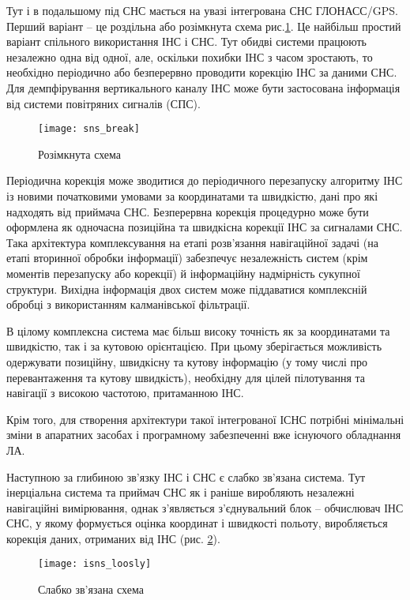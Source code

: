 Тут і в подальшому під СНС мається на увазі інтегрована СНС ГЛОНАСС/GPS. 
Перший варіант -- це роздільна або розімкнута схема рис.\ref{fig:isns_break}.  Це  найбільш 
простий варіант спільного використання ІНС і СНС. Тут обидві системи працюють незалежно 
одна від одної, але, оскільки похибки ІНС з часом зростають, то необхідно періодично
або безперервно проводити корекцію ІНС за даними СНС. Для демпфірування вертикального 
каналу ІНС може бути застосована інформація від системи повітряних сигналів (СПС).
\begin{figure}[here]
\centering
\texttt{[image: sns\_break]}
\caption{Розімкнута схема}
\label{fig:isns_break}
\end{figure}

Періодична корекція може зводитися до періодичного перезапуску алгоритму ІНС із новими 
початковими умовами за координатами та швидкістю, дані про які надходять від приймача СНС. 
Безперервна корекція процедурно може бути оформлена як одночасна позиційна та 
швидкісна корекції ІНС за сигналами СНС. Така архітектура комплексування на  
етапі розв'язання навігаційної задачі (на етапі вторинної обробки інформації) 
забезпечує незалежність систем (крім моментів  перезапуску або корекції) й 
інформаційну надмірність сукупної структури. Вихідна інформація двох систем може 
піддаватися комплексній обробці з використанням калманівської фільтрації.

В цілому комплексна система має більш високу точність як за координатами та швидкістю, 
так і за кутовою орієнтацією. При цьому зберігається можливість одержувати позиційну, 
швидкісну та кутову інформацію (у тому числі про перевантаження та кутову швидкість), 
необхідну для цілей пілотування та навігації з високою частотою, притаманною ІНС.

Крім того, для створення  архітектури такої інтегрованої ІСНС потрібні мінімальні зміни 
в апаратних засобах і програмному забезпеченні вже існуючого обладнання ЛА.

Наступною за глибиною зв'язку ІНС і СНС є слабко зв'язана система. Тут інерціальна 
система та приймач СНС як і раніше виробляють незалежні навігаційні вимірювання, 
однак з'являється з'єднувальний блок -- обчислювач ІНС СНС, у якому формується оцінка 
координат і швидкості польоту, виробляється корекція даних, отриманих від ІНС (рис. 
\ref{fig:isns_loosly}).

\begin{figure}[here]
\centering
\texttt{[image: isns\_loosly]}
\caption{Слабко зв’язана схема}
\label{fig:isns_loosly}
\end{figure}

